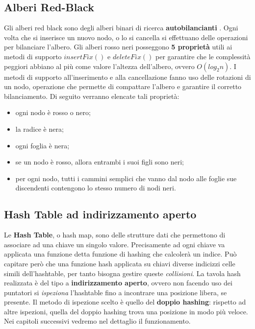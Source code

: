 \subsection{Alberi Red-Black}
Gli alberi red black sono degli alberi binari di ricerca
\textbf{ autobilancianti }. Ogni volta che si inserisce un nuovo 
nodo, o lo 
si cancella si effettuano delle operazioni per bilanciare 
l'albero. Gli alberi rosso neri posseggono \textbf{5 propriet\`a} 
utili
ai metodi di supporto $insertFix()$ e $deleteFix()$ per garantire che le complessit\`a
peggiori abbiano al pi\`u come valore l'altezza dell'albero, ovvero $O(log_2n)$. 
I metodi di supporto all'inserimento e alla cancellazione fanno uso delle rotazioni di un nodo,
operazione che permette di compattare l'albero e garantire il corretto bilanciamento.
Di seguito verranno elencate tali propriet\`a:
\begin{itemize}
    \item ogni nodo \`e rosso o nero;
    \item la radice \`e nera;
    \item ogni foglia \`e nera;
    \item se un nodo \`e rosso, allora entrambi i suoi figli sono neri;
    \item per ogni nodo, tutti i cammini semplici che vanno dal nodo alle foglie sue discendenti
    contengono lo stesso numero di nodi neri.
\end{itemize}

\subsection{Hash Table ad indirizzamento aperto}
Le \textbf{Hash Table}, o hash map, sono delle strutture dati che permettono di associare ad una
chiave un singolo valore. Precisamente ad ogni chiave va applicata una funzione detta funzione
di hashing che calcoler\`a un indice. Pu\`o capitare per\`o che una funzione hash applicata su chiavi diverse 
indicizzi celle simili dell'hashtable, per tanto bisogna gestire queste \textit{collisioni}.
La tavola hash realizzata \`e del tipo a \textbf{indirizzamento aperto}, ovvero non facendo
uso dei puntatori si \textit{ispeziona} l'hashtable fino a incontrare una posizione libera,
se presente. Il metodo di ispezione scelto \`e quello del \textbf{doppio hashing}: rispetto
ad altre ispezioni, quella del doppio hashing trova una posizione in modo pi\`u veloce.
Nei capitoli successivi vedremo nel dettaglio il funzionamento.
